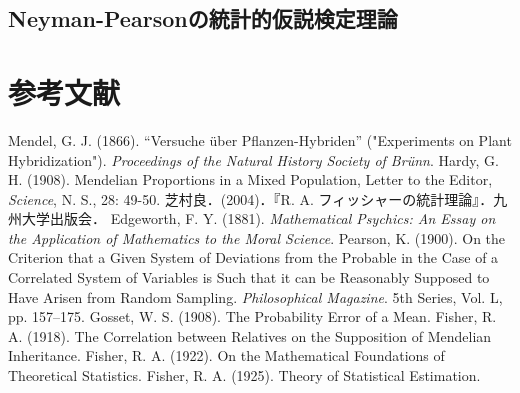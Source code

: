 \documentclass[uplatex,dvipdfmx]{jsreport}
\begin{document}
\section{Neyman-Pearsonの統計的仮説検定理論}



\chapter{参考文献}

\begin{thebibliography}{99}
    Mendel, G. J. (1866). “Versuche über Pflanzen-Hybriden” ("Experiments on Plant Hybridization"). \textit{Proceedings of the Natural History Society of Brünn}.
    Hardy, G. H. (1908). Mendelian Proportions in a Mixed Population, Letter to the Editor, \textit{Science}, N. S., 28: 49-50.
    芝村良．(2004)．『R. A. フィッシャーの統計理論』．九州大学出版会．
    Edgeworth, F. Y. (1881). \textit{Mathematical Psychics: An Essay on the Application of Mathematics to the Moral Science}.
    Pearson, K. (1900). On the Criterion that a Given System of Deviations from the Probable in the Case of a Correlated System of Variables is Such that it can be Reasonably Supposed to Have Arisen from Random Sampling. \textit{Philosophical Magazine}. 5th Series, Vol. L, pp. 157–175.
    Gosset, W. S. (1908). The Probability Error of a Mean.
    Fisher, R. A. (1918). The Correlation between Relatives on the Supposition of Mendelian Inheritance.
    Fisher, R. A. (1922). On the Mathematical Foundations of Theoretical Statistics.
    Fisher, R. A. (1925). Theory of Statistical Estimation.
\end{thebibliography}
\end{document}
